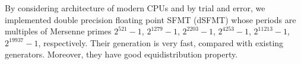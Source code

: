 \documentclass{svmult}
\def\bbf2{\ifmmode \mathbb{F}_2 \else $\mathbb{F}_2$ \fi}
\begin{document}
By considering architecture of modern CPUs and by trial and error, we
implemented double precision floating point SFMT (dSFMT) whose periods
are multiples of 
Mersenne primes $2^{521}-1$, $2^{1279}-1$, $2^{2203}-1$, $2^{4253}-1$, 
$2^{11213}-1$, $2^{19937}-1$, respectively.
Their generation is very fast, compared with existing generators.
Moreover, they have good equidistribution property.


\end{document}
